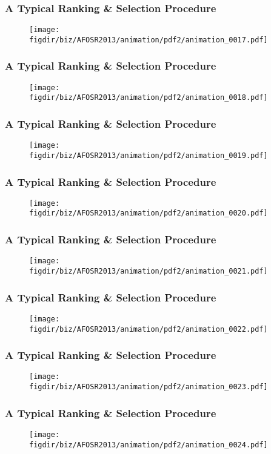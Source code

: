 \documentclass[13pt]{beamer}
\newcommand{\figdir}{../../fig}
\begin{document}
{\begin{frame}\frametitle{A Typical Ranking \& Selection Procedure}\begin{figure}\texttt{[image: \\figdir/biz/AFOSR2013/animation/pdf2/animation\_0017.pdf]}\end{figure}\end{frame}
\begin{frame}\frametitle{A Typical Ranking \& Selection Procedure}\begin{figure}\texttt{[image: \\figdir/biz/AFOSR2013/animation/pdf2/animation\_0018.pdf]}\end{figure}\end{frame}
\begin{frame}\frametitle{A Typical Ranking \& Selection Procedure}\begin{figure}\texttt{[image: \\figdir/biz/AFOSR2013/animation/pdf2/animation\_0019.pdf]}\end{figure}\end{frame}
\begin{frame}\frametitle{A Typical Ranking \& Selection Procedure}\begin{figure}\texttt{[image: \\figdir/biz/AFOSR2013/animation/pdf2/animation\_0020.pdf]}\end{figure}\end{frame}
\begin{frame}\frametitle{A Typical Ranking \& Selection Procedure}\begin{figure}\texttt{[image: \\figdir/biz/AFOSR2013/animation/pdf2/animation\_0021.pdf]}\end{figure}\end{frame}
\begin{frame}\frametitle{A Typical Ranking \& Selection Procedure}\begin{figure}\texttt{[image: \\figdir/biz/AFOSR2013/animation/pdf2/animation\_0022.pdf]}\end{figure}\end{frame}
\begin{frame}\frametitle{A Typical Ranking \& Selection Procedure}\begin{figure}\texttt{[image: \\figdir/biz/AFOSR2013/animation/pdf2/animation\_0023.pdf]}\end{figure}\end{frame}
\begin{frame}\frametitle{A Typical Ranking \& Selection Procedure}\begin{figure}\texttt{[image: \\figdir/biz/AFOSR2013/animation/pdf2/animation\_0024.pdf]}\end{figure}\end{frame}
}
\end{document}
